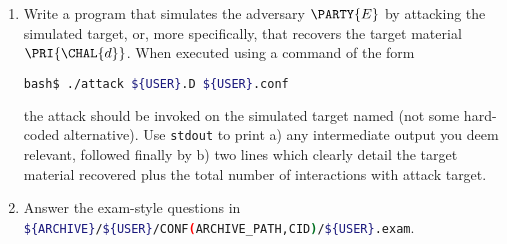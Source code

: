 \documentclass[crop={false},multi={true},tikz={true}]{standalone}
\begin{document}
\begin{enumerate}
\item Write a program that simulates the adversary $\PARTY{E}$ by attacking
      the simulated target, or, more specifically, that recovers the target 
      material $\PRI{\CHAL{d}}$.  
      When executed using a command of the form

      \begin{lstlisting}[language={bash},gobble={6}]
      bash$ ./attack ${USER}.D ${USER}.conf
      \end{lstlisting}

      \noindent
      the attack should be invoked on the simulated target named (not some
      hard-coded alternative).  Use \lstinline[language={bash}]{stdout} to 
      print 
      a) any intermediate output you deem relevant, followed finally by 
      b) two lines which clearly detail the target material recovered plus
         the total number of interactions with attack target.
\item Answer the exam-style questions in  
      \lstinline[language={bash}]|${ARCHIVE}/${USER}/CONF(ARCHIVE_PATH,CID)/${USER}.exam|.
\end{enumerate}


\ifstandalone
\printbibliography
\fi
\end{document}
